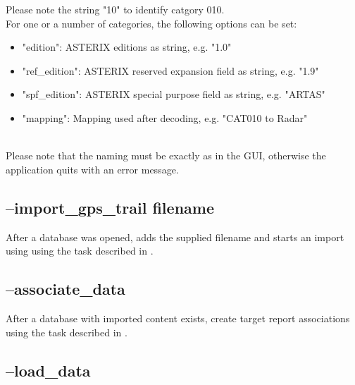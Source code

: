 Please note the string "10" to identify catgory 010. \\

For one or a number of categories, the following options can be set:

\begin{itemize}
\item "edition":  ASTERIX editions as string, e.g. "1.0"
\item "ref\_edition":  ASTERIX reserved expansion field as string, e.g. "1.9"
\item "spf\_edition": ASTERIX special purpose field as string, e.g. "ARTAS"
\item "mapping": Mapping used after decoding, e.g. "CAT010 to Radar"
\end{itemize}
\ \\

Please note that the naming must be exactly as in the GUI, otherwise the application quits with an error message.


\subsection{--import\_gps\_trail filename}

After a database was opened, adds the supplied filename and starts an import using using the task described in .

% 
% 


\subsection{--associate\_data}

After a database with imported content exists, create target report associations using the task described in .

\subsection{--load\_data}

